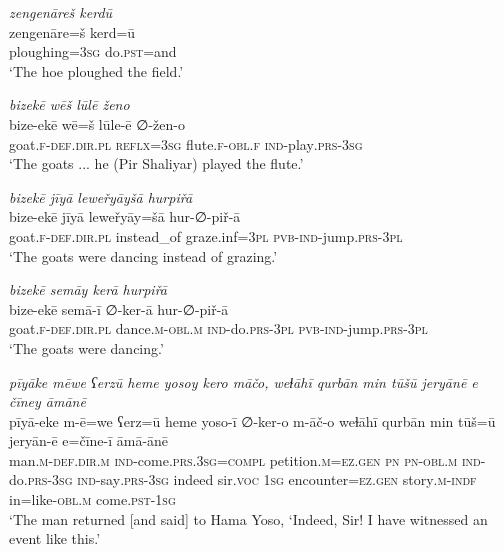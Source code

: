 \ea \label{ŽP.53}
\textit{zengenāreš kerdū} \\ 
\gll zengenāre=š kerd=ū \\ 
 ploughing\textsc{=3sg} do\textsc{.pst}=and \\ 
\glt `The hoe ploughed the field.'
\z 
 
\ea \label{ŽP.54}
\textit{bizekē wēš lūlē ženo} \\ 
\gll bize-ekē wē=š lūle-ē ∅-žen-o \\ 
 goat\textsc{.f}\textsc{-def}\textsc{.dir}\textsc{.pl} \textsc{reflx}\textsc{=3sg} flute\textsc{.f}\textsc{-obl}\textsc{.f} \textsc{ind-}play\textsc{.prs}\textsc{-3sg} \\ 
\glt `The goats ... he (Pir Shaliyar) played the flute.'
\z 
 
\ea \label{ŽP.55}
\textit{bizekē jīyā leweřyāyšā hurpiřā} \\ 
\gll bize-ekē jīyā leweřyāy=šā hur-∅-piř-ā \\ 
 goat\textsc{.f}\textsc{-def}\textsc{.dir}\textsc{.pl} instead\_of graze.inf\textsc{=3pl} \textsc{pvb-}\textsc{ind-}jump\textsc{.prs}\textsc{-3pl} \\ 
\glt `The goats were dancing instead of grazing.'
\z 
 
\ea \label{ŽP.56}
\textit{bizekē semāy kerā hurpiřā} \\ 
\gll bize-ekē semā-ī ∅-ker-ā hur-∅-piř-ā \\ 
 goat\textsc{.f}\textsc{-def}\textsc{.dir}\textsc{.pl} dance\textsc{.m}\textsc{-obl}\textsc{.m} \textsc{ind-}do\textsc{.prs}\textsc{-3pl} \textsc{pvb-}\textsc{ind-}jump\textsc{.prs}\textsc{-3pl} \\ 
\glt `The goats were dancing.'
\z 
 
\ea \label{ŽP.57}
\textit{pīyāke mēwe ʕerzū heme yosoy kero māčo, weɫāhī qurbān min tūšū jeryānē e čīney āmānē} \\ 
\gll pīyā-eke m-ē=we ʕerz=ū heme yoso-ī ∅-ker-o m-āč-o weɫāhī qurbān min tūš=ū jeryān-ē e=čīne-ī āmā-ānē \\ 
 man\textsc{.m}\textsc{-def}\textsc{.dir}\textsc{.m} \textsc{ind-}come\textsc{.prs}\textsc{.3sg}\textsc{=compl} petition\textsc{.m}\textsc{\textsc{=ez.gen}} \textsc{pn} \textsc{pn}\textsc{-obl}\textsc{.m} \textsc{ind-}do\textsc{.prs}\textsc{-3sg} \textsc{ind-}say\textsc{.prs}\textsc{-3sg} indeed sir.\textsc{voc} \textsc{1sg} encounter\textsc{\textsc{=ez.gen}} story\textsc{.m}\textsc{-indf} in=like\textsc{-obl}\textsc{.m} come\textsc{.pst}\textsc{-\textsc{1sg}} \\ 
\glt `The man returned [and said] to Hama Yoso, ‘Indeed, Sir! I have witnessed an event like this.'
\z 
 
